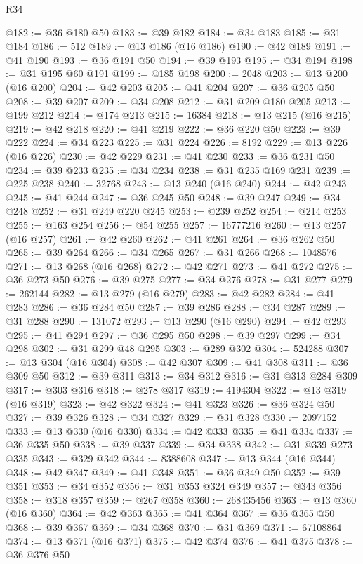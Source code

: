 \begin{lexlean}{R34}
\begin{coremodule}
@182 := @36 @180 @50
@183 := @39 @182
@184 := @34 @183
@185 := @31 @184
@186 := 512
@189 := @13 @186 (@16 @186)
@190 := @42 @189
@191 := @41 @190
@193 := @36 @191 @50
@194 := @39 @193
@195 := @34 @194
@198 := @31 @195 @60 @191
@199 := @185 @198
@200 := 2048
@203 := @13 @200 (@16 @200)
@204 := @42 @203
@205 := @41 @204
@207 := @36 @205 @50
@208 := @39 @207
@209 := @34 @208
@212 := @31 @209 @180 @205
@213 := @199 @212
@214 := @174 @213
@215 := 16384
@218 := @13 @215 (@16 @215)
@219 := @42 @218
@220 := @41 @219
@222 := @36 @220 @50
@223 := @39 @222
@224 := @34 @223
@225 := @31 @224
@226 := 8192
@229 := @13 @226 (@16 @226)
@230 := @42 @229
@231 := @41 @230
@233 := @36 @231 @50
@234 := @39 @233
@235 := @34 @234
@238 := @31 @235 @169 @231
@239 := @225 @238
@240 := 32768
@243 := @13 @240 (@16 @240)
@244 := @42 @243
@245 := @41 @244
@247 := @36 @245 @50
@248 := @39 @247
@249 := @34 @248
@252 := @31 @249 @220 @245
@253 := @239 @252
@254 := @214 @253
@255 := @163 @254
@256 := @54 @255
@257 := 16777216
@260 := @13 @257 (@16 @257)
@261 := @42 @260
@262 := @41 @261
@264 := @36 @262 @50
@265 := @39 @264
@266 := @34 @265
@267 := @31 @266
@268 := 1048576
@271 := @13 @268 (@16 @268)
@272 := @42 @271
@273 := @41 @272
@275 := @36 @273 @50
@276 := @39 @275
@277 := @34 @276
@278 := @31 @277
@279 := 262144
@282 := @13 @279 (@16 @279)
@283 := @42 @282
@284 := @41 @283
@286 := @36 @284 @50
@287 := @39 @286
@288 := @34 @287
@289 := @31 @288
@290 := 131072
@293 := @13 @290 (@16 @290)
@294 := @42 @293
@295 := @41 @294
@297 := @36 @295 @50
@298 := @39 @297
@299 := @34 @298
@302 := @31 @299 @48 @295
@303 := @289 @302
@304 := 524288
@307 := @13 @304 (@16 @304)
@308 := @42 @307
@309 := @41 @308
@311 := @36 @309 @50
@312 := @39 @311
@313 := @34 @312
@316 := @31 @313 @284 @309
@317 := @303 @316
@318 := @278 @317
@319 := 4194304
@322 := @13 @319 (@16 @319)
@323 := @42 @322
@324 := @41 @323
@326 := @36 @324 @50
@327 := @39 @326
@328 := @34 @327
@329 := @31 @328
@330 := 2097152
@333 := @13 @330 (@16 @330)
@334 := @42 @333
@335 := @41 @334
@337 := @36 @335 @50
@338 := @39 @337
@339 := @34 @338
@342 := @31 @339 @273 @335
@343 := @329 @342
@344 := 8388608
@347 := @13 @344 (@16 @344)
@348 := @42 @347
@349 := @41 @348
@351 := @36 @349 @50
@352 := @39 @351
@353 := @34 @352
@356 := @31 @353 @324 @349
@357 := @343 @356
@358 := @318 @357
@359 := @267 @358
@360 := 268435456
@363 := @13 @360 (@16 @360)
@364 := @42 @363
@365 := @41 @364
@367 := @36 @365 @50
@368 := @39 @367
@369 := @34 @368
@370 := @31 @369
@371 := 67108864
@374 := @13 @371 (@16 @371)
@375 := @42 @374
@376 := @41 @375
@378 := @36 @376 @50

\end{coremodule}
\end{lexlean}

